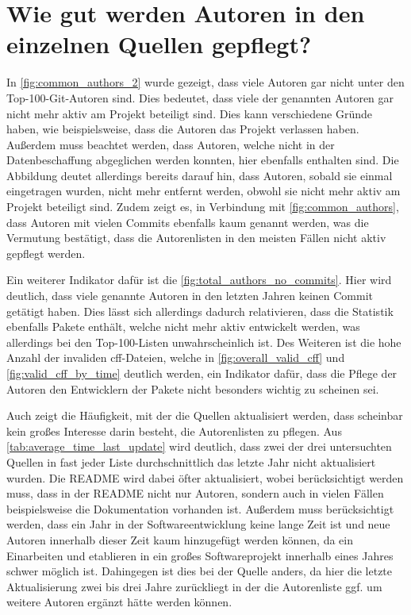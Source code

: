 \section{Wie gut werden Autoren in den einzelnen Quellen gepflegt?}
\label{sec:autoren_pflege_diskussion}
In \autoref{fig:common_authors_2} wurde gezeigt, dass viele Autoren gar nicht unter den Top-100-Git-Autoren sind.
Dies bedeutet, dass viele der genannten Autoren gar nicht mehr aktiv am Projekt beteiligt sind.
Dies kann verschiedene Gründe haben, wie beispielsweise, dass die Autoren das Projekt verlassen haben.
Außerdem muss beachtet werden, dass Autoren, welche nicht in der Datenbeschaffung abgeglichen werden konnten, hier ebenfalls enthalten sind.
Die Abbildung deutet allerdings bereits darauf hin, dass Autoren, sobald sie einmal eingetragen wurden, nicht mehr entfernt werden, obwohl sie nicht mehr aktiv am Projekt beteiligt sind.
Zudem zeigt es, in Verbindung mit \autoref{fig:common_authors}, dass Autoren mit vielen Commits ebenfalls kaum genannt werden, was die Vermutung bestätigt, dass die Autorenlisten in den meisten Fällen nicht aktiv gepflegt werden.

Ein weiterer Indikator dafür ist die \autoref{fig:total_authors_no_commits}.
Hier wird deutlich, dass viele genannte Autoren in den letzten Jahren keinen Commit getätigt haben.
Dies lässt sich allerdings dadurch relativieren, dass die Statistik ebenfalls Pakete enthält, welche nicht mehr aktiv entwickelt werden, was allerdings bei den Top-100-Listen unwahrscheinlich ist.
Des Weiteren ist die hohe Anzahl der invaliden \gls{cff}-Dateien, welche in \autoref{fig:overall_valid_cff} und \autoref{fig:valid_cff_by_time} deutlich werden, ein Indikator dafür, dass die Pflege der Autoren den Entwicklern der Pakete nicht besonders wichtig zu scheinen sei.

Auch zeigt die Häufigkeit, mit der die Quellen aktualisiert werden, dass scheinbar kein großes Interesse darin besteht, die Autorenlisten zu pflegen.
Aus \autoref{tab:average_time_last_update} wird deutlich, dass zwei der drei untersuchten Quellen in fast jeder Liste durchschnittlich das letzte Jahr nicht aktualisiert wurden.
Die README wird dabei öfter aktualisiert, wobei berücksichtigt werden muss, dass in der README nicht nur Autoren, sondern auch in vielen Fällen beispielsweise die Dokumentation vorhanden ist.
Außerdem muss berücksichtigt werden, dass ein Jahr in der Softwareentwicklung keine lange Zeit ist und neue Autoren innerhalb dieser Zeit kaum hinzugefügt werden können, da ein Einarbeiten und etablieren in ein großes Softwareprojekt innerhalb eines Jahres schwer möglich ist.
Dahingegen ist dies bei der  Quelle anders, da hier die letzte Aktualisierung zwei bis drei Jahre zurückliegt in der die Autorenliste ggf. um weitere Autoren ergänzt hätte werden können.

